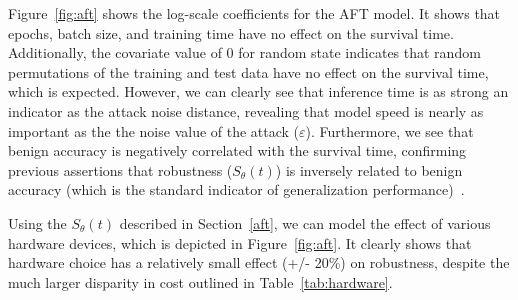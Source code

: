 \documentclass[conference]{IEEEtran}
\begin{document}
Figure~\ref{fig:aft} shows the log-scale coefficients for the AFT model. It shows that epochs, batch size, and training time have no effect on the survival time. Additionally, the covariate value of 0 for random state indicates that random permutations of the training and test data have no effect on the survival time, which is expected. However, we can clearly see that inference time  is as strong an indicator as the attack noise distance, revealing that model speed is nearly as important as the the noise value of the attack ($\varepsilon$). Furthermore, we see that benign accuracy is negatively correlated with the survival time, confirming previous assertions that robustness ($S_{\theta}(t)$) is inversely related to benign accuracy (which is the standard indicator of generalization performance)~\cite{carlini_towards_2017}.

Using the $S_{\theta}(t)$ described in Section~\ref{aft}, we can model the effect of various hardware devices, which is depicted in Figure~\ref{fig:aft}. It clearly shows that hardware choice has a relatively small effect (+/- 20\%) on robustness, despite the much larger disparity in cost outlined in Table~\ref{tab:hardware}.
\end{document}
